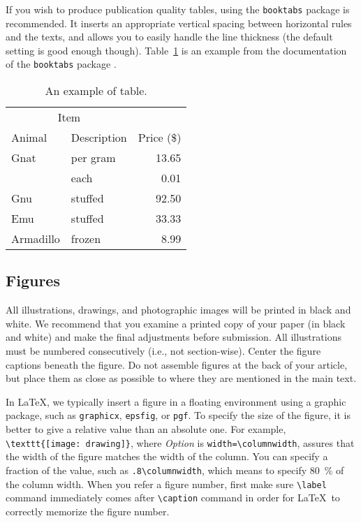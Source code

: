 \documentclass[conference]{worldcomp}
\begin{document}
If you wish to produce publication quality tables, using the \texttt{booktabs} package is recommended.
It inserts an appropriate vertical spacing between horizontal rules and the texts, and allows you to easily handle the line thickness (the default setting is good enough though).
Table~\ref{tab:table_example} is an example from the documentation of the \texttt{booktabs} package \cite{booktabs_doc}.

\begin{table}[htb]\centering
\caption{An example of table.}\label{tab:table_example}
\begin{tabular}{@{}llr@{}} \toprule
\multicolumn{2}{c}{Item} \\ \cmidrule(r){1-2}
Animal & Description & Price (\$)\\ \midrule
Gnat & per gram & 13.65 \\
      & each      & 0.01 \\
Gnu   & stuffed   & 92.50 \\
Emu   & stuffed   & 33.33 \\
Armadillo & frozen & 8.99 \\ \bottomrule
\end{tabular}
\end{table} 


\subsection{Figures}\label{sec:figure}
All illustrations, drawings, and photographic images will be printed in black 
and white. We recommend that you examine a printed copy of your paper (in black 
and white) and make the final adjustments before submission. All illustrations 
must be numbered consecutively (i.e., not section-wise). Center the figure captions 
beneath the figure. Do not assemble figures at the back of your article, but 
place them as close as possible to where they are mentioned in the main text. 


In \LaTeX, we typically insert a figure in a floating environment using a graphic package, such as \texttt{graphicx}, \texttt{epsfig}, or \texttt{pgf}.
To specify the size of the figure, it is better to give a relative value than an absolute one.
For example,  \verb|\texttt{[image: drawing]}|, where \textit{Option} is \verb|width=\columnwidth|, assures that the width of the figure matches the width of the column.
You can specify a fraction of the value, such as \verb|.8\columnwidth|, which means to specify 80~\% of the column width.
When you refer a figure number, first make sure \verb|\label| command immediately comes after \verb|\caption| command in order for \LaTeX\ to correctly memorize the figure number. 
\end{document}
